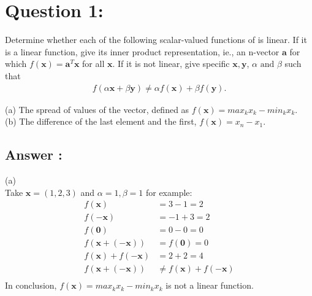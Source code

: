 \documentclass[a4paper,12pt]{article}
\begin{document}
\section*{Question 1:}
Determine whether each of the following scalar-valued functions of  is linear. If it is a linear function, give its inner product representation, ie.,
an n-vector \(\bm{a}\) for which \(f(\bm{x}) = \bm{a}^T\bm{x}\) for all \(\bm{x}\). If it is not linear, give specific \(\bm{x}, \bm{y}\), \(\alpha \text{ and } \beta\) such that
\begin{align*}
    f(\alpha \bm{x} + \beta \bm{y}) \neq \alpha f(\bm{x}) + \beta f(\bm{y}).
\end{align*}

(a) The spread of values of the vector, defined as \(f(\bm{x}) = max_kx_k - min_kx_k \). \\
(b) The difference of the last element and the first, \(f(\bm{x}) = x_n - x_1\). \\

\subsection*{Answer :}
(a)  \\
Take \(\bm{x} = (1, 2, 3)\) and \(\alpha = 1, \beta = 1\) for example:
\begin{align*}
    f(\bm{x}) &= 3 - 1 = 2 \\
    f(\bm{-x}) &= -1 + 3 = 2 \\
    f(\bm{0}) &= 0 - 0 = 0 \\
    f(\bm{x} + (-\bm{x})) &= f(\bm{0}) = 0 \\
    f(\bm{x}) + f(-\bm{x}) &= 2 + 2 = 4 \\
    f(\bm{x} + (-\bm{x})) &\neq f(\bm{x}) + f(-\bm{x}) \\
\end{align*}
In conclusion, \(f(\bm{x}) = max_kx_k - min_kx_k \) is not a linear function. \\
\end{document}
